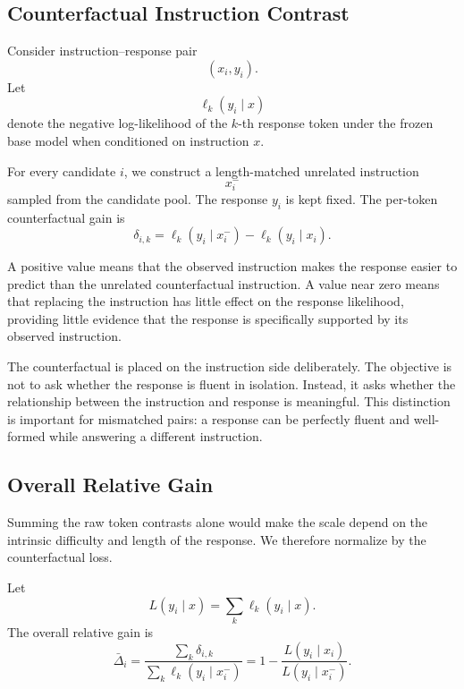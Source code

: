 \subsection{Counterfactual Instruction Contrast}
\label{app:gate-counterfactual}

Consider instruction--response pair
\[
(x_i,y_i).
\]
Let
\[
\ell_k(y_i\mid x)
\]
denote the negative log-likelihood of the \(k\)-th response token
under the frozen base model when conditioned on instruction \(x\).

For every candidate \(i\), we construct a length-matched unrelated
instruction
\[
x_i^{-}
\]
sampled from the candidate pool. The response \(y_i\) is kept fixed.
The per-token counterfactual gain is
\begin{equation}
\delta_{i,k}
=
\ell_k(y_i\mid x_i^{-})
-
\ell_k(y_i\mid x_i).
\label{eq:gate-token-contrast}
\end{equation}

A positive value means that the observed instruction makes the
response easier to predict than the unrelated counterfactual
instruction. A value near zero means that replacing the instruction
has little effect on the response likelihood, providing little
evidence that the response is specifically supported by its observed
instruction.

The counterfactual is placed on the instruction side deliberately.
The objective is not to ask whether the response is fluent in
isolation. Instead, it asks whether the relationship between the
instruction and response is meaningful. This distinction is important
for mismatched pairs: a response can be perfectly fluent and
well-formed while answering a different instruction.


\subsection{Overall Relative Gain}
\label{app:gate-global-gain}

Summing the raw token contrasts alone would make the scale depend on
the intrinsic difficulty and length of the response. We therefore
normalize by the counterfactual loss.

Let
\[
L(y_i\mid x)
=
\sum_k \ell_k(y_i\mid x).
\]
The overall relative gain is
\begin{equation}
\bar{\Delta}_i
=
\frac{
\sum_k \delta_{i,k}
}{
\sum_k \ell_k(y_i\mid x_i^{-})
}
=
1-
\frac{
L(y_i\mid x_i)
}{
L(y_i\mid x_i^{-})
}.
\label{eq:gate-global-gain}
\end{equation}


